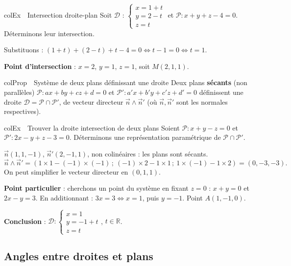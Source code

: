 \documentclass[11pt,a4paper]{article}
\newenvironment{propriete}[1][Propriété]
  {\begin{fiche}{colProp}{\ding{72}~~#1}}{\end{fiche}}
\newenvironment{exemple}[1][Exemple]
  {\begin{fiche}{colEx}{\ding{217}~~#1}}{\end{fiche}}
\begin{document}
\begin{exemple}[Intersection droite-plan]
Soit $\mathcal{D}$ : $\begin{cases}x=1+t\\y=2-t\\z=t\end{cases}$ et $\mathcal{P}:x+y+z-4=0$. Déterminons leur intersection.

\smallskip
Substituons : $(1+t)+(2-t)+t-4=0\iff t-1=0\iff t=1$.

\smallskip
\textbf{Point d'intersection} : $x=2$, $y=1$, $z=1$, soit $M(2,1,1)$.
\end{exemple}

\begin{propriete}[Système de deux plans définissant une droite]
Deux plans \textbf{sécants} (non parallèles) $\mathcal{P}:ax+by+cz+d=0$ et $\mathcal{P}':a'x+b'y+c'z+d'=0$ définissent une droite $\mathcal{D}=\mathcal{P}\cap\mathcal{P}'$, de vecteur directeur $\vec n\wedge\vec n'$ (où $\vec n,\vec n'$ sont les normales respectives).
\end{propriete}

\begin{exemple}[Trouver la droite intersection de deux plans]
Soient $\mathcal{P}:x+y-z=0$ et $\mathcal{P}':2x-y+z-3=0$. Déterminons une représentation paramétrique de $\mathcal{P}\cap\mathcal{P}'$.

\smallskip
$\vec n(1,1,-1)$, $\vec n'(2,-1,1)$, non colinéaires : les plans sont sécants.
\[
  \vec n\wedge\vec n' = (1\times1-(-1)\times(-1)\,;\ (-1)\times2-1\times1\,;\ 1\times(-1)-1\times2) = (0,-3,-3).
\]
On peut simplifier le vecteur directeur en $(0,1,1)$.

\smallskip
\textbf{Point particulier} : cherchons un point du système en fixant $z=0$ : $x+y=0$ et $2x-y=3$. En additionnant : $3x=3\iff x=1$, puis $y=-1$. Point $A(1,-1,0)$.

\smallskip
\textbf{Conclusion} : $\mathcal{D}:\begin{cases}x=1\\y=-1+t\\z=t\end{cases}$, $t\in\mathbb{R}$.
\end{exemple}

\subsection{Angles entre droites et plans}
\end{document}
